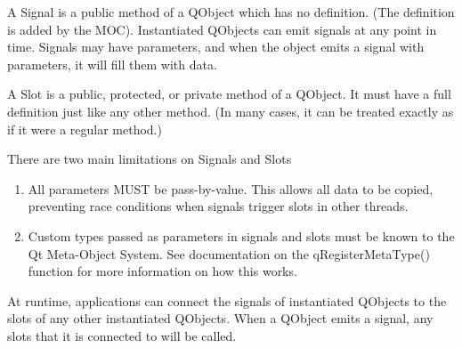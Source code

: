A Signal is a public method of a QObject which has no definition. (The definition is added by the MOC). Instantiated QObjects can emit signals at any point in time. Signals may have parameters, and when the object emits a signal with parameters, it will fill them with data.

A Slot is a public, protected, or private method of a QObject. It must have a full definition just like any other method. (In many cases, it can be treated exactly as if it were a regular method.)

There are two main limitations on Signals and Slots
\begin{enumerate}
	\item All parameters MUST be pass-by-value. This allows all data to be copied, preventing race conditions when signals trigger slots in other threads.
	\item Custom types passed as parameters in signals and slots must be known to the Qt Meta-Object System. See documentation on the qRegisterMetaType() function for more information on how this works.
\end{enumerate}

At runtime, applications can connect the signals of instantiated QObjects to the slots of any other instantiated QObjects. When a QObject emits a signal, any slots that it is connected to will be called.


